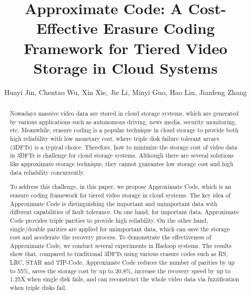 \documentclass[sigconf]{acmart}
\begin{document}
\title{Approximate Code: A Cost-Effective Erasure Coding Framework for Tiered Video Storage in Cloud Systems}

\author{Huayi Jin, Chentao Wu, Xin Xie, Jie Li, Minyi Guo, Hao Lin, Jianfeng Zhang}

\begin{abstract}
Nowadays massive video data are stored in cloud storage systems, which are generated by various applications such as autonomous driving, news media, security monitoring, etc. Meanwhile, erasure coding is a popular technique in cloud storage to provide both high reliability with low monetary cost, where triple disk failure tolerant arrays (3DFTs) is a typical choice. Therefore, how to minimize the storage cost of video data in 3DFTs is challenge for cloud storage systems. Although there are several solutions like approximate storage technique, they cannot guarantee low storage cost and high data reliability concurrently.

To address this challenge, in this paper, we propose Approximate Code, which is an erasure coding framework for tiered video storage in cloud systems. The key idea of Approximate Code is distinguishing the important and unimportant data with different capabilities of fault tolerance. On one hand, for important data, Approximate Code provides triple parities to provide high reliability. On the other hand, single/double parities are applied for unimportant data, which can save the storage cost and accelerate the recovery process. To demonstrate the effectiveness of Approximate Code, we conduct several experiments in Hadoop systems. The results show that, compared to traditional 3DFTs using various erasure codes such as RS, LRC, STAR and TIP-Code, Approximate Code reduces the number of parities by up to 55\%, saves the storage cost by up to 20.8\%, increase the recovery speed by up to 1.25X when single disk fails, and can reconstruct the whole video data via fuzzification when triple disks fail.
\end{abstract}


\maketitle
\end{document}
